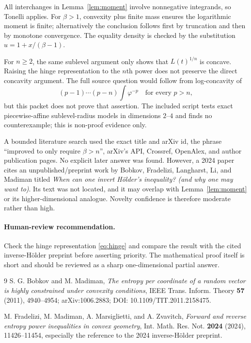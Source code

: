 \documentclass[11pt]{article}
\begin{document}
All interchanges in Lemma~\ref{lem:moment} involve nonnegative integrands, so
Tonelli applies. For $\beta>1$, convexity plus finite mass ensures the
logarithmic moment is finite; alternatively the conclusion follows first by
truncation and then by monotone convergence. The equality density is checked
by the substitution $u=1+x/(\beta-1)$.

For $n\geq2$, the same sublevel argument only shows that
$L(t)^{1/n}$ is concave. Raising the hinge representation to the $n$th power
does not preserve the direct concavity argument. The full source question
would follow from log-concavity of
\[
 (p-1)\cdots(p-n)\int\varphi^{-p}
 \quad\text{for every }p>n,
\]
but this packet does not prove that assertion. The included script tests exact
piecewise-affine sublevel-radius models in dimensions $2$--$4$ and finds no
counterexample; this is non-proof evidence only.

A bounded literature search used the exact title and arXiv id, the phrase
``improved to only require $\beta>n$'', arXiv's API, Crossref, OpenAlex, and
author publication pages. No explicit later answer was found. However, a 2024
paper~\cite{FM} cites an unpublished/preprint work by Bobkov, Fradelizi,
Langharst, Li, and Madiman titled \emph{When can one invert Hölder's
inequality? (and why one may want to)}. Its text was not located, and it may
overlap with Lemma~\ref{lem:moment} or its higher-dimensional analogue.
Novelty confidence is therefore moderate rather than high.

\paragraph{Human-review recommendation.}
Check the hinge representation \eqref{eq:hinge} and compare the result with
the cited inverse-Hölder preprint before asserting priority. The mathematical
proof itself is short and should be reviewed as a sharp one-dimensional
partial answer.

\begin{thebibliography}{9}
S. G. Bobkov and M. Madiman,
\emph{The entropy per coordinate of a random vector is highly constrained
under convexity conditions}, IEEE Trans. Inform. Theory \textbf{57} (2011),
4940--4954; arXiv:1006.2883; DOI: 10.1109/TIT.2011.2158475.

M. Fradelizi, M. Madiman, A. Marsiglietti, and A. Zvavitch,
\emph{Forward and reverse entropy power inequalities in convex geometry},
Int. Math. Res. Not. \textbf{2024} (2024), 11426--11454, especially the
reference to the 2024 inverse-Hölder preprint.
\end{thebibliography}
\end{document}
